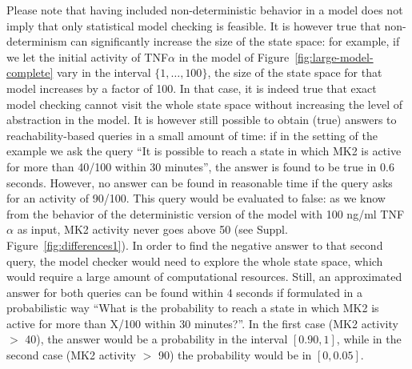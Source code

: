 \documentclass{bmcart}
\begin{document}
Please note that having included non-deterministic behavior in a model does not imply that only
statistical model checking is feasible. It is however true that non-determinism can significantly increase the size
of the state space: for example, if we let the initial activity of TNF$\alpha$ in the model of Figure~\ref{fig:large-model-complete}
vary in the interval $\{1, \dots, 100\}$, the size of the state space for that model increases by a factor of 100.
In that case, it is indeed true that exact model checking cannot visit the whole state space without increasing the level
of abstraction in the model. 
It is however still possible to obtain (true) answers to reachability-based queries in
a small amount of time: if in the setting of the example we ask the query ``It is possible to reach a state in which
MK2 is active for more than 40/100 within 30 minutes'', the answer is found to be true in 0.6 seconds. However, no
answer can be found in reasonable time if the query asks for an activity of 90/100.
This query would be evaluated to false: as we know from the behavior of the deterministic version of the model with 100 ng/ml TNF$\alpha$ as input,
MK2 activity never goes above 50 (see Suppl. Figure~\ref{fig:differences1}). In order to find the negative answer
to that second query, the model checker would need to explore the whole state space,
which would require a large amount of computational resources. Still, an approximated
answer for both queries can be found within 4 seconds if formulated in a probabilistic way ``What is the probability
to reach a state in which MK2 is active for more than X/100 within 30 minutes?''. In the first case (MK2 activity $>$ 40), the answer would
be a probability in the interval $[0.90, 1]$, while in the second case (MK2 activity $>$ 90) the probability would be in $[0, 0.05]$.

\end{document}
